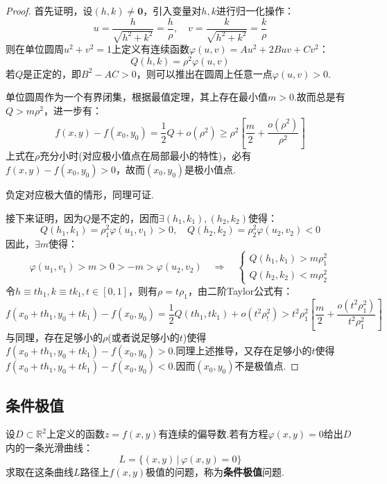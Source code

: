 \begin{proof}
    首先证明，设$(h,k)\neq\bm{0}$，引入变量对$h,k$进行归一化操作：
    \[u = \frac{h}{\sqrt{h^2+k^2}} = \frac{h}{\rho},\quad v = \frac{k}{\sqrt{h^2+k^2}} = \frac{k}{\rho}\]
    则在单位圆周$u^2+v^2=1$上定义有连续函数$\varphi(u,v) = Au^2+2Buv+Cv^2$：
    \[Q(h,k) = \rho^2\varphi(u,v)\]
    若$Q$是正定的，即$B^2-AC > 0$，则可以推出在圆周上任意一点$\varphi(u,v)>0$.

    单位圆周作为一个有界闭集，根据最值定理，其上存在最小值$m>0$.故而总是有$Q > m\rho^2$，进一步有：
    \[f(x,y)-f(x_0,y_0) = \frac{1}{2}Q + o(\rho^2) \geqslant \rho^2\left[\frac{m}{2} + \frac{o(\rho^2)}{\rho^2}\right]\]
    上式在$\rho$充分小时(对应极小值点在局部最小的特性)，必有$f(x,y)-f(x_0,y_0) > 0$，故而$(x_0,y_0)$是极小值点.

    负定对应极大值的情形，同理可证.

    接下来证明，因为$Q$是不定的，因而$\exists(h_1,k_1),(h_2,k_2)$使得：
    \[Q(h_1,k_1) = \rho^2_1\varphi(u_1,v_1) > 0,\quad Q(h_2,k_2) = \rho^2_2\varphi(u_2,v_2) < 0\]
    因此，$\exists m$使得：
    \[\varphi(u_1,v_1) > m > 0 > -m > \varphi(u_2,v_2) \quad\Rightarrow\quad \begin{cases}
        Q(h_1,k_1) > m\rho_1^2 \\
        Q(h_2,k_2) < m\rho_2^2
    \end{cases} \]
    令$h \equiv th_1,k\equiv tk_1,t\in[0,1]$，则有$\rho = t\rho_1$，由二阶Taylor公式有：
    \[f(x_0+th_1,y_0+tk_1)-f(x_0,y_0) = \frac{1}{2}Q(th_1,tk_1)+o(t^2\rho_!^2) > t^2\rho_1^2\left[\frac{m}{2}+\frac{o(t^2\rho_1^2)}{t^2\rho_1^2}\right]\]
    与同理，存在足够小的$\rho$(或者说足够小的$t$)使得$f(x_0+th_1,y_0+tk_1)-f(x_0,y_0)>0$.同理上述推导，又存在足够小的$t$使得$f(x_0+th_1,y_0+tk_1)-f(x_0,y_0)<0$.因而$(x_0,y_0)$不是极值点.
\end{proof}


\subsection{条件极值}
设$D \subset \mathbb{R}^2$上定义的函数$z = f(x,y)$有连续的偏导数.若有方程$\varphi(x,y)=0$给出$D$内的一条光滑曲线：
\[L = \{(x,y)\,|\,\varphi(x,y) = 0\}\]
求取在这条曲线$L$路径上$f(x,y)$极值的问题，称为\textbf{条件极值}问题.


